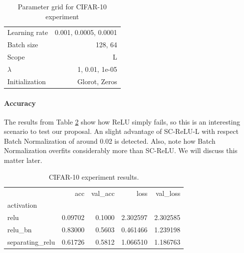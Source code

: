 \begin{table}[h]
\centering
\begin{tabular}{lr}
Learning rate  &  0.001, 0.0005, 0.0001 \\
Batch size     &                128, 64 \\
Scope          &           L \\
$\lambda$           &         1, 0.01, 1e-05 \\
Initialization &          Glorot, Zeros \\
\end{tabular}
\caption{Parameter grid for CIFAR-10 experiment}
  \label{tab:grid_cifar10}
\end{table}

\paragraph{Accuracy} The results from Table \ref{tab:cifar10} show how ReLU simply fails, so this is an interesting scenario to test our proposal. An slight advantage of SC-ReLU-L with respect Batch Normalization of around 0.02 is detected. Also, note how Batch Normalization overfits considerably more than SC-ReLU. We will discuss this matter later. 

\begin{table}[h]
\centering
\begin{tabular}{lrrrr}
{} &      acc &  val\_acc &      loss &  val\_loss \\
activation         &          &          &           &           \\
relu               &  0.09702 &   0.1000 &  2.302597 &  2.302585 \\
relu\_bn            &  0.83000 &   0.5603 &  0.461466 &  1.239198 \\
separating\_relu    &  0.61726 &   0.5812 &  1.066510 &  1.186763 \\
\end{tabular}
\caption{CIFAR-10 experiment results.}
  \label{tab:cifar10}
\end{table}

